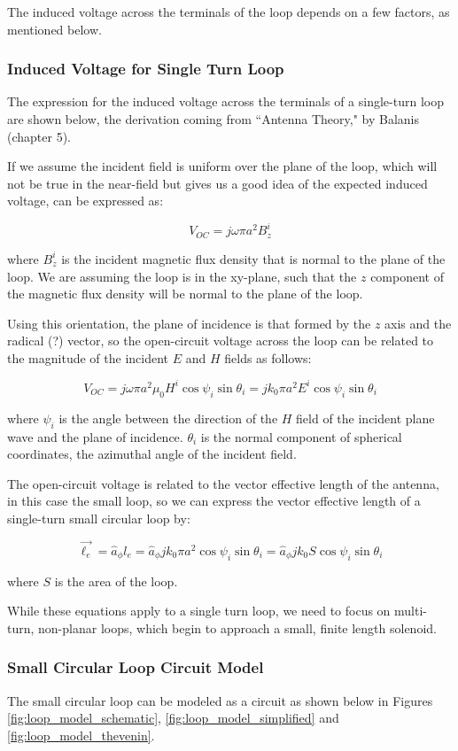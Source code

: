 \documentclass[12pt,onecolumn,titlepage]{article}
\begin{document}
The induced voltage across the terminals of the loop depends on a few factors, as mentioned below.


\subsubsection{Induced Voltage for Single Turn Loop}
\indent \indent The expression for the induced voltage across the terminals of a single-turn loop are shown below, the derivation coming from ``Antenna Theory," by Balanis (chapter 5).

If we assume the incident field is uniform over the plane of the loop, which will not be true in the near-field but gives us a good idea of the expected induced voltage, can be expressed as:

\[ V_{OC} = j \omega \pi a^2 B_z^i \]

where $B_z^i$ is the incident magnetic flux density that is normal to the plane of the loop. We are assuming the loop is in the xy-plane, such that the $z$ component of the magnetic flux density will be normal to the plane of the loop.

Using this orientation, the plane of incidence is that formed by the $z$ axis and the radical (?) vector, so the open-circuit voltage across the loop can be related to the magnitude of the incident $E$ and $H$ fields as follows:

\[ V_{OC} = j \omega \pi a^2 \mu_0 H^i \cos \psi_i \sin \theta_i = j k_0 \pi a^2 E^i \cos \psi_i \sin \theta_i \]

where $\psi_i$ is the angle between the direction of the $H$ field of the incident plane wave and the plane of incidence. $\theta_i$ is the normal component of spherical coordinates, the azimuthal angle of the incident field.

The open-circuit voltage is related to the vector effective length of the antenna, in this case the small loop, so we can express the vector effective length of a single-turn small circular loop by:

\[ \vec{\ell_e} = \hat{a}_\phi l_e = \hat{a}_\phi j k_0 \pi a^2 \cos \psi_i \sin \theta_i = \hat{a}_\phi j k_0 S \cos \psi_i \sin \theta_i  \]

where $S$ is the area of the loop. 

While these equations apply to a single turn loop, we need to focus on multi-turn, non-planar loops, which begin to approach a small, finite length solenoid.


\subsubsection{Small Circular Loop Circuit Model}
\indent \indent The small circular loop can be modeled as a circuit as shown below in Figures \ref{fig:loop_model_schematic}, \ref{fig:loop_model_simplified} and \ref{fig:loop_model_thevenin}. 
\end{document}
